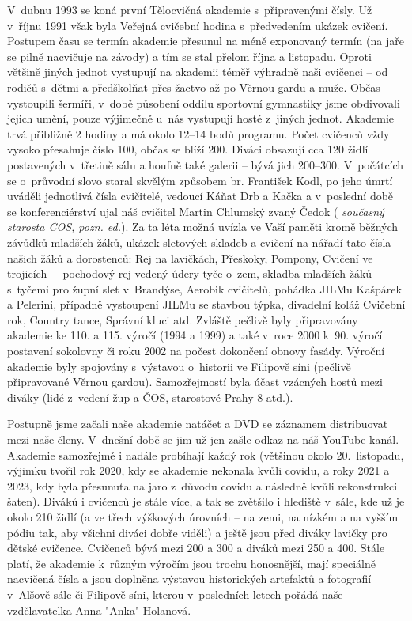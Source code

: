 \documentclass[a5paper, 11pt, twoside]{article}
\newcommand{\pozned}[1]{%
\textit{#1}}
\begin{document}
V~dubnu 1993 se koná první Tělocvičná akademie s~připravenými čísly. Už
v~říjnu 1991 však byla Veřejná cvičební hodina s~předvedením ukázek
cvičení. Postupem času se termín akademie přesunul na méně exponovaný
termín (na jaře se pilně nacvičuje na závody) a tím se stal přelom října
a listopadu. Oproti většině jiných jednot vystupují na akademii téměř
výhradně naši cvičenci -- od rodičů s~dětmi a předškolňat přes žactvo až
po Věrnou gardu a muže. Občas vystoupili šermíři, v~době působení oddílu
sportovní gymnastiky jsme obdivovali jejich umění, pouze výjimečně u~nás
vystupují hosté z~jiných jednot. Akademie trvá přibližně 2 hodiny a má
okolo 12--14 bodů programu. Počet cvičenců vždy vysoko přesahuje číslo
100, občas se blíží 200. Diváci obsazují cca 120 židlí postavených
v~třetině sálu a houfně také galerii -- bývá jich 200--300. V~počátcích se
o~průvodní slovo staral skvělým způsobem br. František Kodl, po jeho
úmrtí uváděli jednotlivá čísla cvičitelé, vedoucí Káňat Drb a Kačka a
v~poslední době se konferenciérství ujal náš cvičitel Martin Chlumský
zvaný Čedok (\pozned{současný starosta ČOS, pozn. ed.}). Za ta léta možná
uvízla ve Vaší paměti kromě běžných závůdků mladších žáků, ukázek
sletových skladeb a cvičení na nářadí tato čísla našich žáků a
dorostenců: Rej na lavičkách, Přeskoky, Pompony, Cvičení ve trojicích +
pochodový rej vedený údery tyče o~zem, skladba mladších žáků s~tyčemi
pro župní slet v~Brandýse, Aerobik cvičitelů, pohádka JILMu Kašpárek a
Pelerini, případně vystoupení JILMu se stavbou týpka, divadelní koláž
Cvičební rok, Country tance, Správní kluci atd. Zvláště pečlivě byly
připravovány akademie ke 110. a 115. výročí (1994 a 1999) a také v~roce
2000 k~90. výročí postavení sokolovny či roku 2002 na počest dokončení
obnovy fasády. Výroční akademie byly spojovány s~výstavou o~historii ve
Filipově síni (pečlivě připravované Věrnou gardou). Samozřejmostí byla
účast vzácných hostů mezi diváky (lidé z~vedení žup a ČOS, starostové
Prahy 8 atd.).

Postupně jsme začali naše akademie natáčet a DVD se záznamem
distribuovat mezi naše členy. V~dnešní době se jim už jen zašle odkaz na
náš YouTube kanál. Akademie samozřejmě i nadále probíhají každý rok
(většinou okolo 20.~listopadu, výjimku tvořil rok 2020, kdy se akademie
nekonala kvůli covidu, a roky 2021 a 2023, kdy byla přesunuta na jaro
z~důvodu covidu a následně kvůli rekonstrukci šaten). Diváků i cvičenců je
stále více, a tak se zvětšilo i hlediště v~sále, kde už je okolo 210
židlí (a ve třech výškových úrovních -- na zemi, na nízkém a na vyšším
pódiu tak, aby všichni diváci dobře viděli) a ještě jsou před diváky
lavičky pro dětské cvičence. Cvičenců bývá mezi 200 a 300 a diváků mezi
250 a 400. Stále platí, že akademie k~různým výročím jsou trochu
honosnější, mají speciálně nacvičená čísla a jsou doplněna výstavou
historických artefaktů a fotografií v~Alšově sále či Filipově síni,
kterou v~posledních letech pořádá naše vzdělavatelka Anna "Anka"
Holanová.
\end{document}
